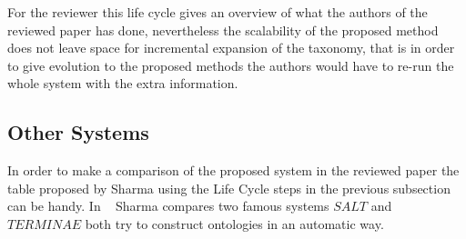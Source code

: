\documentclass[4pt,a4paper,twocolumn]{article}
\begin{document}
For the reviewer this life cycle gives an overview of what the authors of the reviewed paper has done, nevertheless the scalability of the proposed method does not leave space for incremental expansion of the taxonomy, that is in order to give evolution to the proposed methods the authors would have to re-run the whole system with the extra information.



\subsection*{Other Systems}

In order to make a comparison of the proposed system in the reviewed paper the table proposed by Sharma using the Life Cycle steps in the previous subsection can be handy. In ~\cite{IJOATsemantic-domain-ontology} Sharma compares two famous systems  $SALT$ and $TERMINAE$ both try to construct ontologies in an automatic way.
\end{document}
